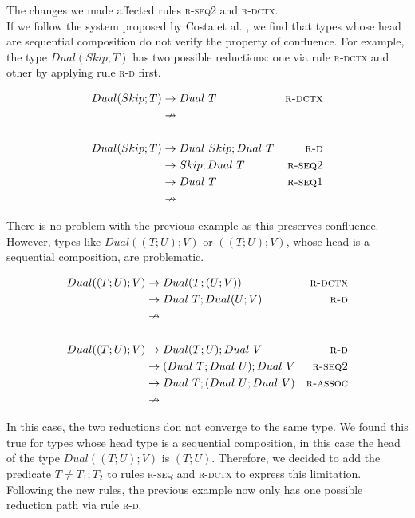 \documentclass[sigplan]{acmart}
\newcommand{\srule}[1]{\textsc{#1}}
\begin{document}
The changes we made affected rules \srule{r-seq2} and \srule{r-dctx}.\\
If we follow the system proposed by Costa et al. \cite{PocasCMV23}, we find that types whose head are sequential composition do not verify the property of confluence. For example, the type $Dual ( Skip ; T )$ has two possible reductions: one via rule \srule{r-dctx} and other by applying rule \srule{r-d} first.

\begin{align*}
  \mathtt\mathit Dual (Skip;T) & \rightarrow \mathtt \mathit Dual\ T  & \srule{r-dctx}\\
  & \nrightarrow\\
  \\
  \mathtt\mathit Dual (Skip;T) & \rightarrow \mathtt\mathit Dual\ Skip; Dual\ T & \srule{r-d}\\
  & \rightarrow \mathtt\mathit Skip; Dual\ T & \srule{r-seq2}\\
  & \rightarrow \mathtt\mathit Dual\ T & \srule{r-seq1}\\
  & \nrightarrow
\end{align*}

There is no problem with the previous example as this preserves confluence. However, types like $Dual (( T ; U ) ; V)$ or $((T;U);V)$, whose head is a sequential composition, are problematic.

\begin{align*}
  \mathtt\mathit Dual (( T ; U ) ; V) & \rightarrow \mathtt\mathit Dual(T; (U;V)) & \srule{r-dctx}\\
  & \rightarrow \mathtt\mathit  Dual\ T ; Dual (U;V) & \srule{r-d}\\
  & \nrightarrow\\
  \\
  \mathtt\mathit Dual (( T ; U ) ; V) & \rightarrow \mathtt\mathit Dual(T;U) ; Dual\ V & \srule{r-d}\\
  & \rightarrow \mathtt (Dual\ T ; Dual\ U ); Dual\ V & \srule{r-seq2}\\
  & \rightarrow \mathtt\mathit Dual\ T ; (Dual\ U ; Dual\ V) & \srule{r-assoc}\\
  & \nrightarrow
\end{align*}

In this case, the two reductions don not converge to the same type. We found this true for types whose head type is a sequential composition, in this case the head of the type $Dual ((T;U);V)$ is $(T;U)$. Therefore, we decided to add the predicate $T \neq T_1;T_2$ to rules \srule{r-seq} and \srule{r-dctx} to express this limitation. Following the new rules, the previous example now only has one possible reduction path via rule \srule{r-d}.
\end{document}
